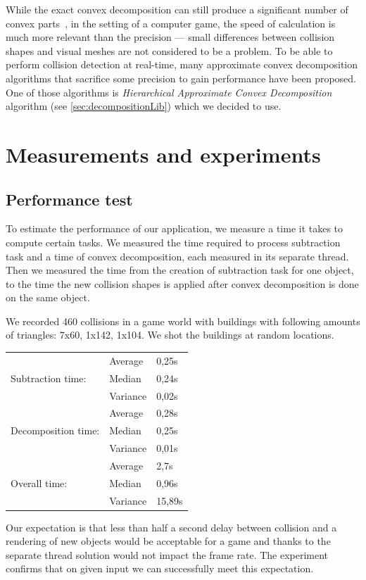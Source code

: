 While the exact convex decomposition can still produce a significant number of convex parts~\cite{convexDecomp}, in the setting of a computer game, the speed of calculation is much more relevant than the precision --- small differences between collision shapes and visual meshes are not considered to be a problem. To be able to perform collision detection at real-time, many approximate convex decomposition algorithms that sacrifice some precision to gain performance have been proposed. One of those algorithms is \emph{Hierarchical Approximate Convex Decomposition} algorithm (see \cref{sec:decompositionLib}) which we decided to use.

\section{Measurements and experiments}
\label{sec:testing}

\subsection{Performance test}
To estimate the performance of our application, we measure a time it takes to compute certain tasks. We measured the time required to process subtraction task and a time of convex decomposition, each measured in its separate thread. Then we measured the time from the creation of subtraction task for one object, to the time the new collision shapes is applied after convex decomposition is done on the same object.

We recorded 460 collisions in a game world with buildings with following amounts of triangles: 7x60, 1x142, 1x104. We shot the buildings at random locations.

\begin{tabular}{lll}
& Average & 0,25s \\
Subtraction time: & Median & 0,24s \\
& Variance & 0,02s \\
\hline
& Average & 0,28s \\
Decomposition time: & Median & 0,25s \\
& Variance & 0,01s \\
\hline
& Average & 2,7s \\
Overall time:& Median & 0,96s \\
& Variance & 15,89s \\
\end{tabular}

Our expectation is that less than half a second delay between collision and a rendering of new objects would be acceptable for a game and thanks to the separate thread solution would not impact the frame rate. The experiment confirms that on given input we can successfully meet this expectation.

